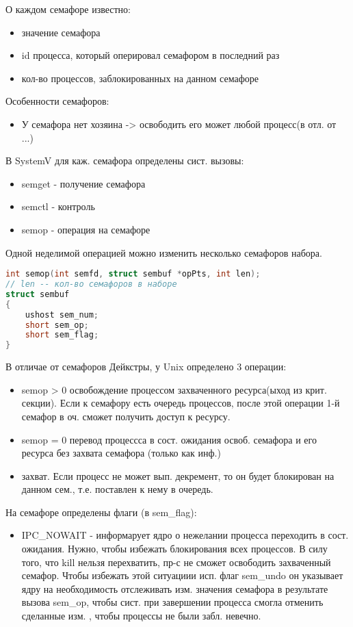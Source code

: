 О каждом семафоре известно:
\begin{itemize}
	\item значение семафора
	\item id процесса, который оперировал семафором в последний раз
	\item кол-во процессов, заблокированных на данном семафоре
\end{itemize}

Особенности семафоров:
\begin{itemize}
	\item У семафора нет хозяина -> освободить его может любой процесс(в отл. от ...)
\end{itemize}

В SystemV для каж. семафора определены сист. вызовы:
\begin{itemize}
	\item semget - получение семафора
	\item semctl - контроль
	\item semop - операция на семафоре
\end{itemize}
Одной неделимой операцией можно изменить несколько семафоров набора.

\begin{lstlisting}[language=c]
int semop(int semfd, struct sembuf *opPts, int len);
// len -- кол-во семафоров в наборе
struct sembuf
{
	ushost sem_num;
	short sem_op;
	short sem_flag;
}
\end{lstlisting}
	
В отличае от семафоров Дейкстры, у Unix определено 3 операции:
\begin{itemize}
	\item semop > 0 освобождение процессом захваченного ресурса(ыход из крит. секции). Если к семафору есть очередь процессов, после этой операции 1-й семафор в оч. сможет получить доступ к ресурсу.
	\item semop = 0 перевод процессса в сост. ожидания освоб. семафора и его ресурса без захвата семафора (только как инф.)
	\item захват. Если процесс не может вып. декремент, то он будет блокирован на данном сем., т.е. поставлен к нему в очередь.
\end{itemize}

На семафоре определены флаги (в sem\_flag):
\begin{itemize}
	\item IPC\_NOWAIT - информарует ядро о нежелании процесса переходить в сост. ожидания. Нужно, чтобы избежать блокирования всех процессов. В силу того, что kill нельзя перехватить, пр-с не сможет освободить захваченный семафор. Чтобы избежать этой ситуациии исп. флаг sem\_undo он указывает ядру на необходимость отслеживать изм. значения семафора в результате вызова sem\_op, чтобы сист. при завершении процесса смогла отменить сделанные изм. , чтобы процессы не были забл. невечно.
\end{itemize}
 
